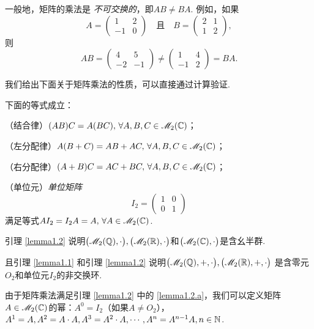     一般地，矩阵的乘法是 \emph{不可交换的}，即$AB\ne BA$. 例如，如果
    \[
      A = \begin{pmatrix}
        1 & 2 \\
        -1 & 0
      \end{pmatrix}\quad \text{且}\quad
      B = \begin{pmatrix}
        2 & 1 \\
        1 & 2
      \end{pmatrix},
    \]
    则
    \[
      AB = \begin{pmatrix}
        4 & 5 \\
        -2 & -1
      \end{pmatrix} \ne
      \begin{pmatrix}
        1 & 4\\
        -1 & 2
      \end{pmatrix} = BA.
    \]

    我们给出下面关于矩阵乘法的性质，可以直接通过计算验证.
  \begin{lemma}
    下面的等式成立：
    \begin{enum}
      \item\label{lemma1.2.a} （结合律）$(AB)C=A(BC),\,\forall A,B,C\in\mathscr M_2(\mathbb C)$；
      \item （左分配律）$A(B+C)=AB+AC,\,\forall A,B,C\in\mathscr M_2(\mathbb C)$；
      \item （右分配律）$(A+B)C=AC+BC,\,\forall A,B,C\in\mathscr M_2(\mathbb C)$；
      \item （单位元）\emph{单位矩阵}
      \[
        I_2 = \begin{pmatrix}
          1 & 0 \\
          0 & 1
        \end{pmatrix}
      \]
      满足等式$AI_2=I_2A=A,\,\forall A\in\mathscr M_2(\mathbb C)$.
    \end{enum}
  \end{lemma}
  \begin{remark}
    引理 \ref{lemma1.2} 说明$\big(  \mathscr M_2(\mathbb Q),\cdot\big),
    \big(\mathscr M_2(\mathbb R),\cdot\big)$和$\big(\mathscr M_2(\mathbb C),\cdot\big)$是含幺半群.
  \end{remark}

  且引理 \ref{lemma1.1} 和引理 \ref{lemma1.2} 说明$\big(\mathscr M_2(\mathbb Q),+,\cdot\big),\big(\mathscr M_2(\mathbb R),+,\cdot\big)$
  是含零元$O_2$和单位元$I_2$的非交换环.

  由于矩阵乘法满足引理 \ref{lemma1.2} 中的 \ref{lemma1.2.a}，我们可以定义矩阵$A\in\mathscr M_2(\mathbb C)$的幂：$A^0=I_2$（如果$A\ne O_2$），$A^1=A,A^2=A\cdot A,A^3=A^2\cdot A,\cdots,A^n=A^{n-1}A,n\in\mathbb N$.


